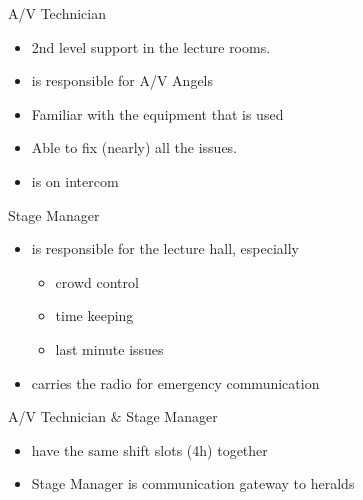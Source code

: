 \documentclass[aspectratio=169]{beamer}
\begin{document}
\begin{frame}{A/V Technician}
	\begin{itemize}
		\item 2nd level support in the lecture rooms. 
		\item is responsible for A/V Angels
		\item Familiar with the equipment that is used 
		\item Able to fix (nearly) all the issues. 
		\item is on intercom
	\end{itemize}
\end{frame}


\begin{frame}{Stage Manager}
\begin{itemize}
	\item is responsible for the lecture hall, especially
	\begin{itemize}
		\item crowd control
		\item time keeping
		\item last minute issues 
	\end{itemize}
	\item carries the radio for emergency communication
\end{itemize}
\end{frame}

\begin{frame}{A/V Technician \& Stage Manager}
\begin{itemize}
	\item have the same shift slots (4h) together
	\item Stage Manager is communication gateway to heralds
\end{itemize}
\end{frame}
\end{document}
